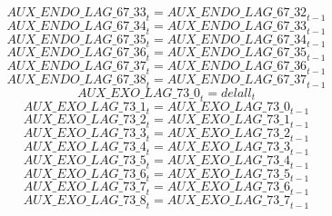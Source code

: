 \begin{dmath}
{AUX\_ENDO\_LAG\_67\_33}_{t}={AUX\_ENDO\_LAG\_67\_32}_{t-1}
\end{dmath}
\begin{dmath}
{AUX\_ENDO\_LAG\_67\_34}_{t}={AUX\_ENDO\_LAG\_67\_33}_{t-1}
\end{dmath}
\begin{dmath}
{AUX\_ENDO\_LAG\_67\_35}_{t}={AUX\_ENDO\_LAG\_67\_34}_{t-1}
\end{dmath}
\begin{dmath}
{AUX\_ENDO\_LAG\_67\_36}_{t}={AUX\_ENDO\_LAG\_67\_35}_{t-1}
\end{dmath}
\begin{dmath}
{AUX\_ENDO\_LAG\_67\_37}_{t}={AUX\_ENDO\_LAG\_67\_36}_{t-1}
\end{dmath}
\begin{dmath}
{AUX\_ENDO\_LAG\_67\_38}_{t}={AUX\_ENDO\_LAG\_67\_37}_{t-1}
\end{dmath}
\begin{dmath}
{AUX\_EXO\_LAG\_73\_0}_{t}={delall}_{t}
\end{dmath}
\begin{dmath}
{AUX\_EXO\_LAG\_73\_1}_{t}={AUX\_EXO\_LAG\_73\_0}_{t-1}
\end{dmath}
\begin{dmath}
{AUX\_EXO\_LAG\_73\_2}_{t}={AUX\_EXO\_LAG\_73\_1}_{t-1}
\end{dmath}
\begin{dmath}
{AUX\_EXO\_LAG\_73\_3}_{t}={AUX\_EXO\_LAG\_73\_2}_{t-1}
\end{dmath}
\begin{dmath}
{AUX\_EXO\_LAG\_73\_4}_{t}={AUX\_EXO\_LAG\_73\_3}_{t-1}
\end{dmath}
\begin{dmath}
{AUX\_EXO\_LAG\_73\_5}_{t}={AUX\_EXO\_LAG\_73\_4}_{t-1}
\end{dmath}
\begin{dmath}
{AUX\_EXO\_LAG\_73\_6}_{t}={AUX\_EXO\_LAG\_73\_5}_{t-1}
\end{dmath}
\begin{dmath}
{AUX\_EXO\_LAG\_73\_7}_{t}={AUX\_EXO\_LAG\_73\_6}_{t-1}
\end{dmath}
\begin{dmath}
{AUX\_EXO\_LAG\_73\_8}_{t}={AUX\_EXO\_LAG\_73\_7}_{t-1}
\end{dmath}
